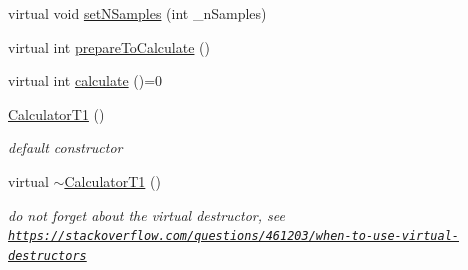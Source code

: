 \begin{DoxyCompactItemize}
\item 
virtual void \hyperlink{class_ox_1_1_calculator_t1_ab49b849d3235e243f67118b57d232d46}{set\-N\-Samples} (int \-\_\-n\-Samples)
\item 
virtual int \hyperlink{class_ox_1_1_calculator_t1_a528d2528b1814116bdc266a726dd2303}{prepare\-To\-Calculate} ()
\item 
virtual int \hyperlink{class_ox_1_1_calculator_t1_ab8d5ec3f03e070ca11d3accb59a92299}{calculate} ()=0
\item 
\hypertarget{class_ox_1_1_calculator_t1_aee286228db734cdd8c6c0686b85fa938}{\hyperlink{class_ox_1_1_calculator_t1_aee286228db734cdd8c6c0686b85fa938}{Calculator\-T1} ()}\label{class_ox_1_1_calculator_t1_aee286228db734cdd8c6c0686b85fa938}

\begin{DoxyCompactList}\small\item\em default constructor \end{DoxyCompactList}\item 
\hypertarget{class_ox_1_1_calculator_t1_af5d360f92d3c1b1c2f4241e528451f2e}{virtual \hyperlink{class_ox_1_1_calculator_t1_af5d360f92d3c1b1c2f4241e528451f2e}{$\sim$\-Calculator\-T1} ()}\label{class_ox_1_1_calculator_t1_af5d360f92d3c1b1c2f4241e528451f2e}

\begin{DoxyCompactList}\small\item\em do not forget about the virtual destructor, see \href{https://stackoverflow.com/questions/461203/when-to-use-virtual-destructors}{\tt https\-://stackoverflow.\-com/questions/461203/when-\/to-\/use-\/virtual-\/destructors} \end{DoxyCompactList}\end{DoxyCompactItemize}
